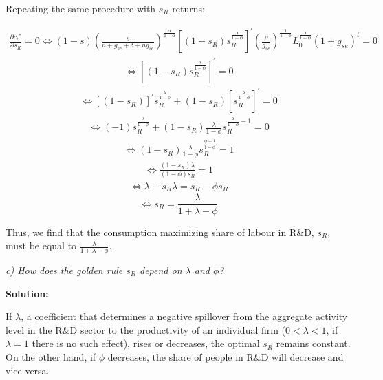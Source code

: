 \documentclass[11pt]{article} %
\begin{document}
\par Repeating the same procedure with $s_R$ returns:

\begin{align*}
    \frac{\partial{c_t}^*}{\partial{s_R}} = 0
    \Longleftrightarrow (1-s)\left(\frac{s}{n+g_{se}+\delta+ng_{se}}\right)^{\frac{\alpha}{1-\alpha}}\left[(1-s_{R})s_R^{\frac{\lambda}{1-\phi}}\right]^{'}\left(\frac{\rho}{g_{se}} \right)^{\frac{1}{1-\phi}}L_0^{\frac{\lambda}{1-\phi}}(1+g_{se})^t=0
\end{align*}
\begin{align*}
    \Longleftrightarrow
    \left[(1-s_{R})s_R^{\frac{\lambda}{1-\phi}}\right]^{'} 
    = 0
\end{align*}
\begin{align*}
    \Longleftrightarrow
    \left[(1-s_{R})\right]^{'} s_R^{\frac{\lambda}{1-\phi}}
    + (1-s_{R}) \left[s_R^{\frac{\lambda}{1-\phi}}\right]^{'}
    = 0
\end{align*}
\begin{align*}
    \Longleftrightarrow
    (-1)s_R^{\frac{\lambda}{1-\phi}}
    + (1-s_{R}) \frac{\lambda}{1-\phi} s_R^{\frac{\lambda}{1-\phi}-1}
    = 0
\end{align*}
\begin{align*}
    \Longleftrightarrow
    (1-s_{R}) \frac{\lambda}{1-\phi} s_R^{\frac{\phi-1}{1-\phi}}
    = 1
\end{align*}
\begin{align*}
    \Longleftrightarrow
    \frac{(1-s_{R})\lambda}{(1-\phi)s_R}
    = 1
\end{align*}
\begin{align*}
    \Longleftrightarrow
    \lambda-s_R\lambda
    = s_R-\phi s_R
\end{align*}
\begin{equation}
    \Longleftrightarrow
    s_R = \frac{\lambda}{1+\lambda-\phi}
\end{equation}

\bigskip \par Thus, we find that the consumption maximizing share of labour in R&D, $s_R$, must be equal to $\frac{\lambda}{1+\lambda-\phi}$.











\pagebreak
\textit{c) How does the golden rule $s_R$ depend on $\lambda$ and $\phi$?}

\bigskip\bigskip\bigskip\par \textbf{Solution:}
\par If $\lambda$, a coefficient that determines a negative spillover from the aggregate activity level in the R&D sector to the productivity of an individual firm ($0<\lambda<1$, if $\lambda=1$ there is no such effect), rises or decreases, the optimal $s_R$ remains constant. On the other hand, if $\phi$ decreases, the share of people in R&D will decrease and vice-versa.
\end{document}
